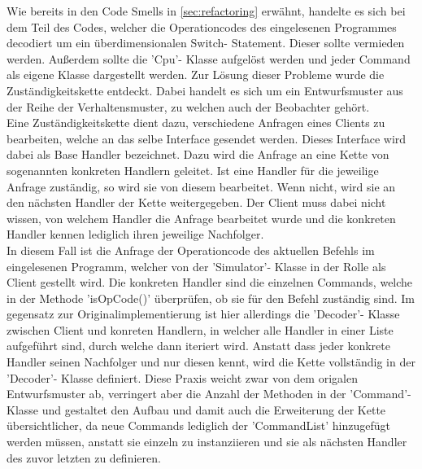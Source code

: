 \documentclass[12pt,a4paper,titlepage,ngerman,pdftex]{report}
\begin{document}
    Wie bereits in den Code Smells in \autoref{sec:refactoring} erwähnt, handelte es sich bei dem Teil des Codes, welcher die Operationcodes des eingelesenen Programmes decodiert um ein überdimensionalen Switch- Statement.
    Dieser sollte vermieden werden. Außerdem sollte die 'Cpu'- Klasse aufgelöst werden und jeder Command als eigene Klasse dargestellt werden. Zur Lösung dieser Probleme wurde die Zuständigkeitskette entdeckt.
    Dabei handelt es sich um ein Entwurfsmuster aus der Reihe der Verhaltensmuster, zu welchen auch der Beobachter gehört. 
    \\
    Eine Zuständigkeitskette dient dazu, verschiedene Anfragen eines Clients zu bearbeiten, welche an das selbe Interface gesendet werden. Dieses Interface wird dabei als Base Handler bezeichnet. Dazu wird die Anfrage an eine Kette von sogenannten konkreten Handlern geleitet.
    Ist eine Handler für die jeweilige Anfrage zuständig, so wird sie von diesem bearbeitet. Wenn nicht, wird sie an den nächsten Handler der Kette weitergegeben. Der Client muss dabei nicht wissen, von welchem Handler die Anfrage bearbeitet wurde und die konkreten Handler kennen lediglich ihren jeweilige Nachfolger.
    \\
    In diesem Fall ist die Anfrage der Operationcode des aktuellen Befehls im eingelesenen Programm, welcher von der 'Simulator'- Klasse in der Rolle als Client gestellt wird. Die konkreten Handler sind die einzelnen Commands, welche in der Methode 'isOpCode()' überprüfen, ob sie für den Befehl zuständig sind.
    Im gegensatz zur Originalimplementierung ist hier allerdings die 'Decoder'- Klasse zwischen Client und konreten Handlern, in welcher alle Handler in einer Liste aufgeführt sind, durch welche dann iteriert wird. Anstatt dass jeder konkrete Handler seinen Nachfolger und nur diesen kennt, wird die Kette vollständig in der 'Decoder'- Klasse definiert.
    Diese Praxis weicht zwar von dem origalen Entwurfsmuster ab, verringert aber die Anzahl der Methoden in der 'Command'-Klasse und gestaltet den Aufbau und damit auch die Erweiterung der Kette übersichtlicher, da neue Commands lediglich der 'CommandList' hinzugefügt werden müssen,
    anstatt sie einzeln zu instanziieren und sie als nächsten Handler des zuvor letzten zu definieren.
\end{document}
